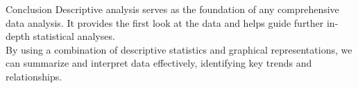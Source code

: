 \documentclass{beamer}
\begin{document}
	\begin{frame}{Conclusion}
		Descriptive analysis serves as the foundation of any comprehensive data analysis. It provides the first look at the data and helps guide further in-depth statistical analyses. \\
		\vspace{0.5cm}
		By using a combination of descriptive statistics and graphical representations, we can summarize and interpret data effectively, identifying key trends and relationships.
	\end{frame}
	
	
\end{document}
